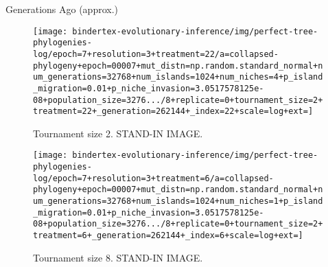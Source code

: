 \begin{figure*}
  \centering
  \begin{minipage}{\textwidth}
    \centering
    Generations Ago (approx.)
  \end{minipage}
  \begin{minipage}{\textwidth}
    \hspace{0.02\linewidth}
    \hfill
    \hfill
    \hfill
    \hfill
  \end{minipage}
  \begin{subfigure}[t]{\linewidth}
    \centering
  \texttt{[image: bindertex-evolutionary-inference/img/perfect-tree-phylogenies-log/epoch=7+resolution=3+treatment=22/a=collapsed-phylogeny+epoch=00007+mut\_distn=np.random.standard\_normal+num\_generations=32768+num\_islands=1024+num\_niches=4+p\_island\_migration=0.01+p\_niche\_invasion=3.0517578125e-08+population\_size=3276.../8+replicate=0+tournament\_size=2+treatment=22+\_generation=262144+\_index=22+scale=log+ext=]}
    \caption{%
    Tournament size 2.
    STAND-IN IMAGE.
    }
    \label{fig:wse-phylogenies-tsize2}
  \end{subfigure}

  \begin{subfigure}[t]{\linewidth}
    \centering
\texttt{[image: bindertex-evolutionary-inference/img/perfect-tree-phylogenies-log/epoch=7+resolution=3+treatment=6/a=collapsed-phylogeny+epoch=00007+mut\_distn=np.random.standard\_normal+num\_generations=32768+num\_islands=1024+num\_niches=1+p\_island\_migration=0.01+p\_niche\_invasion=3.0517578125e-08+population\_size=3276.../8+replicate=0+tournament\_size=2+treatment=6+\_generation=262144+\_index=6+scale=log+ext=]}
    \caption{%
      Tournament size 8.
      STAND-IN IMAGE.
    }
    \label{fig:wse-phylogenies-tsize8}
  \end{subfigure}

\caption{%
\textbf{Phylogenies from on-hardware experiment.}
\footnotesize
Subfigures \ref{fig:wse-phylogenies-tsize2} and \ref{fig:wse-phylogenies-tsize8} contrast phylogenies from experiments with lower and higher selection pressure, respectively.
Note the recognizable decrease in phylogenetic richness under high selection pressure.
Each phylogeny subsampled to 131,072 taxa.
}
\label{fig:wse-phylogenies}

\end{figure*}
